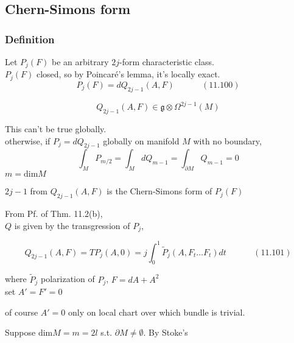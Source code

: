 \documentclass[twoside]{amsart}
\begin{document}
\subsection{}



\subsection{}

\subsection{Chern-Simons form}


\subsubsection{ Definition }

Let $P_j(F)$ be an arbitrary $2j$-form characteristic class. \\
\phantom{Let } $P_j(F)$ closed, so by Poincar\'{e}'s lemma, it's locally exact. \\
\begin{equation}
  P_j(F) = dQ_{2j-1}(A,F) \quad \quad \quad \, (11.100)
\end{equation}

\[
Q_{2j-1}(A,F) \in \mathfrak{g} \otimes \Omega^{2j-1}(M)
\]

This can't be true globally. \\
\quad otherwise, if $P_j=dQ_{2j-1}$ globally on manifold $M$ with no boundary, 
\[
\int_M P_{m/2} = \int_M dQ_{m-1} = \int_{\partial M} Q_{m-1} = 0 
\]
$m = \text{dim}{M}$

$2j-1$  from $Q_{2j-1}(A,F)$ is the Chern-Simons form of $P_j(F)$

From Pf. of Thm. 11.2(b),  \\
\quad $Q$ is given by the transgression of $P_j$,

\begin{equation}
  Q_{2j-1}(A,F) = TP_j(A,0) = j \int_0^1 \widetilde{P}_j(A, F_t \dots F_t)dt \quad \quad \quad \, (11.101)
\end{equation}

where $\widetilde{P}_j$ polarization of $P_j$, $F= dA + A^2$ \\
\quad set $A'=F' =0$

of course $A'=0$ only on local chart over which bundle is trivial.  

Suppose $\text{dim}{M} = m = 2l$ s.t. $\partial M \neq \emptyset$.  By Stoke's 
\end{document}
